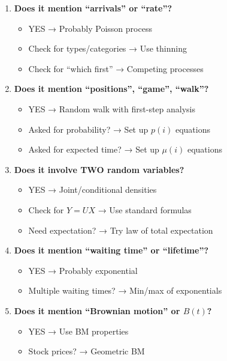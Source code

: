 \documentclass[10pt,letterpaper]{article}
\begin{document}
\begin{enumerate}[leftmargin=*]
  \item \textbf{Does it mention ``arrivals'' or ``rate''?}
    \begin{itemize}
      \item YES → Probably Poisson process
      \item Check for types/categories → Use thinning
      \item Check for ``which first'' → Competing processes
    \end{itemize}

  \item \textbf{Does it mention ``positions'', ``game'', ``walk''?}
    \begin{itemize}
      \item YES → Random walk with first-step analysis
      \item Asked for probability? → Set up $p(i)$ equations
      \item Asked for expected time? → Set up $\mu(i)$ equations
    \end{itemize}

  \item \textbf{Does it involve TWO random variables?}
    \begin{itemize}
      \item YES → Joint/conditional densities
      \item Check for $Y = UX$ → Use standard formulas
      \item Need expectation? → Try law of total expectation
    \end{itemize}

  \item \textbf{Does it mention ``waiting time'' or ``lifetime''?}
    \begin{itemize}
      \item YES → Probably exponential
      \item Multiple waiting times? → Min/max of exponentials
    \end{itemize}

  \item \textbf{Does it mention ``Brownian motion'' or $B(t)$?}
    \begin{itemize}
      \item YES → Use BM properties
      \item Stock prices? → Geometric BM
    \end{itemize}
\end{enumerate}
\end{document}

